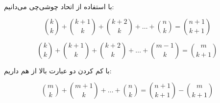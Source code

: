 \p		
با استفاده از اتحاد چوشی‌چی می‌دانیم:

\[
\binom{k}{k} + \binom{k + 1}{k} + \binom{k + 2}{k} +\ldots +
\binom{n}{k} = \binom{n + 1}{k + 1}
\]

\[
\binom{k}{k} + \binom{k + 1}{k} + \binom{k + 2}{k} +\ldots +
\binom{m - 1}{k} = \binom{m}{k + 1}
\]

با کم کردن دو عبارت بالا از هم داریم:

\[
\binom{m}{k} + \binom{m + 1}{k} +\ldots +
\binom{n}{k} = \binom{n + 1}{k + 1} - \binom{m}{k + 1}
\]